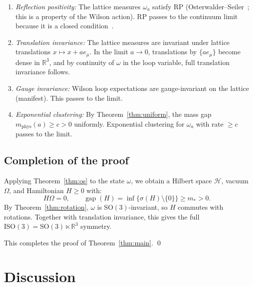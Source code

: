 \documentclass[11pt,a4paper]{article}
\theoremstyle{plain}
\theoremstyle{definition}
\theoremstyle{remark}
\newcommand{\R}{\mathbb{R}}
\newcommand{\gap}{\operatorname{gap}}
\newcommand{\SO}{\mathrm{SO}}
\newcommand{\ISO}{\mathrm{ISO}}
\newcommand{\cH}{\mathcal{H}}
\begin{document}
\begin{enumerate}[label=(\alph*)]
  \item \emph{Reflection positivity:}
    The lattice measures $\omega_a$ satisfy RP
    (Osterwalder--Seiler~\cite{OS78}; this is a
    property of the Wilson action). RP passes to
    the continuum limit because it is a
    closed condition~\cite{GJ87}.

  \item \emph{Translation invariance:}
    The lattice measures are invariant under lattice
    translations $x \mapsto x + a e_\mu$.
    In the limit $a \to 0$, translations by
    $\{a e_\mu\}$ become dense in $\R^3$, and
    by continuity of $\omega$ in the loop variable,
    full translation invariance follows.

  \item \emph{Gauge invariance:}
    Wilson loop expectations are gauge-invariant
    on the lattice (manifest). This passes to the limit.

  \item \emph{Exponential clustering:}
    By Theorem~\ref{thm:uniform}, the mass gap
    $m_{\mathrm{phys}}(a) \ge c > 0$ uniformly.
    Exponential clustering for $\omega_a$ with
    rate $\ge c$ passes to the limit.
\end{enumerate}

\subsection{Completion of the proof}

Applying Theorem~\ref{thm:os} to the state $\omega$,
we obtain a Hilbert space $\cH$, vacuum $\Omega$, and
Hamiltonian $H \ge 0$ with:
\begin{equation}
  H \Omega = 0, \qquad
  \gap(H) = \inf\{\sigma(H) \setminus \{0\}\}
  \ge m_* > 0.
\end{equation}
By Theorem~\ref{thm:rotation}, $\omega$ is
$\SO(3)$-invariant, so $H$ commutes with rotations.
Together with translation invariance, this gives
the full $\ISO(3) = \SO(3) \ltimes \R^3$ symmetry.

This completes the proof of Theorem~\ref{thm:main}.
\qed

\section{Discussion}\label{sec:discussion}
\end{document}
